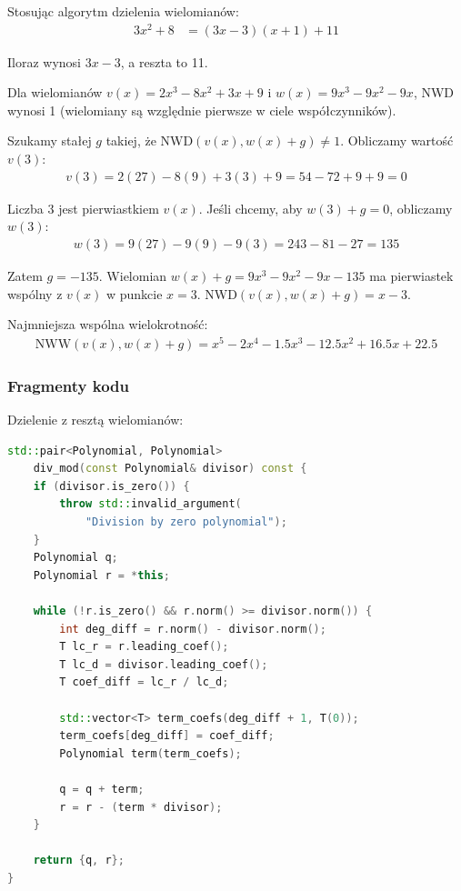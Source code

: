 \documentclass{article}
\begin{document}
Stosując algorytm dzielenia wielomianów:
\begin{align*}
3x^2 + 8 &= (3x - 3)(x + 1) + 11
\end{align*}

Iloraz wynosi \(3x - 3\), a reszta to 11.

Dla wielomianów \(v(x) = 2x^3 - 8x^2 + 3x + 9\) i \(w(x) = 9x^3 - 9x^2 - 9x\), NWD wynosi 1 (wielomiany są względnie pierwsze w ciele współczynników).

Szukamy stałej \(g\) takiej, że NWD\((v(x), w(x) + g) \neq 1\). Obliczamy wartość \(v(3)\):
\begin{align*}
v(3) = 2(27) - 8(9) + 3(3) + 9 = 54 - 72 + 9 + 9 = 0
\end{align*}

Liczba 3 jest pierwiastkiem \(v(x)\). Jeśli chcemy, aby \(w(3) + g = 0\), obliczamy \(w(3)\):
\begin{align*}
w(3) = 9(27) - 9(9) - 9(3) = 243 - 81 - 27 = 135
\end{align*}

Zatem \(g = -135\). Wielomian \(w(x) + g = 9x^3 - 9x^2 - 9x - 135\) ma pierwiastek wspólny z \(v(x)\) w punkcie \(x = 3\). NWD\((v(x), w(x) + g) = x - 3\).

Najmniejsza wspólna wielokrotność:
\begin{align*}
\text{NWW}(v(x), w(x) + g) = x^5 - 2x^4 - 1.5x^3 - 12.5x^2 + 16.5x + 22.5
\end{align*}

\subsubsection*{Fragmenty kodu}

Dzielenie z resztą wielomianów:

\begin{lstlisting}[language=C++]
std::pair<Polynomial, Polynomial> 
    div_mod(const Polynomial& divisor) const {
    if (divisor.is_zero()) {
        throw std::invalid_argument(
            "Division by zero polynomial");
    }
    Polynomial q;
    Polynomial r = *this;

    while (!r.is_zero() && r.norm() >= divisor.norm()) {
        int deg_diff = r.norm() - divisor.norm();
        T lc_r = r.leading_coef();
        T lc_d = divisor.leading_coef();
        T coef_diff = lc_r / lc_d;

        std::vector<T> term_coefs(deg_diff + 1, T(0));
        term_coefs[deg_diff] = coef_diff;
        Polynomial term(term_coefs);

        q = q + term;
        r = r - (term * divisor);
    }

    return {q, r};
}
\end{lstlisting}
\end{document}
